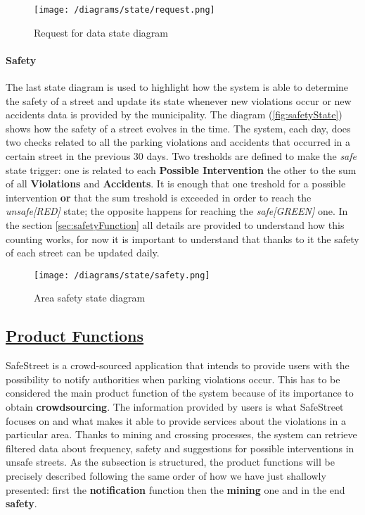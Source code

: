 			\vspace{0.3cm}
			\begin{figure}[h]
				\centering
				\texttt{[image: /diagrams/state/request.png]}
				\caption{\label{fig:requestState}Request for data state diagram}
			\end{figure}
		
		\paragraph{Safety}
			The last state diagram is used to highlight how the system is able to determine the safety of a street and update its state whenever new violations occur or new accidents data is provided by the municipality. The diagram (\autoref{fig:safetyState}) shows how the safety of a street evolves in the time. The system, each day, does two checks related to all the parking violations and accidents that occurred in a certain street in the previous 30 days. Two tresholds are defined to make the \textit{safe} state trigger: one is related to each \textbf{Possible Intervention} the other to the sum of all \textbf{Violations} and \textbf{Accidents}. It is enough that one treshold for a possible intervention \textbf{or} that the sum treshold is exceeded in order to reach the \textit{unsafe[RED]} state; the opposite happens for reaching the \textit{safe[GREEN]} one. In the section \ref{sec:safetyFunction} all details are provided to understand how this counting works, for now it is important to understand that thanks to it the safety of each street can be updated daily.
			
			\vspace{0.3cm}
			\begin{figure}[h]
				\centering
				\texttt{[image: /diagrams/state/safety.png]}
				\caption{\label{fig:safetyState}Area safety state diagram}
			\end{figure}   

\subsection[Product Functions]{\hyperlink{toc}{Product Functions}}
	\label{sec:productFunctions}
	SafeStreet is a crowd-sourced application that intends to provide users with the possibility to notify authorities when parking violations occur. This has to be considered the main product function of the system because of its importance to obtain \textbf{crowdsourcing}. The information provided by users is what SafeStreet focuses on and what makes it able to provide services about the violations in a particular area. Thanks to mining and crossing processes, the system can retrieve filtered data about frequency, safety and suggestions for possible interventions in unsafe streets. As the subsection is structured, the product functions will be precisely described following the same order of how we have just shallowly presented: first the \textbf{notification} function then the \textbf{mining} one and in the end \textbf{safety}. \\
	
